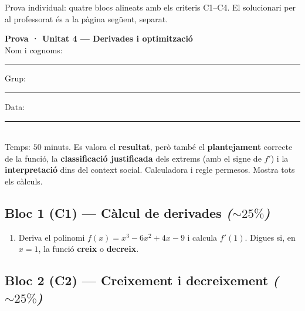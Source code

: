 %
{Prova individual: quatre blocs alineats amb els criteris C1–C4. El solucionari per al professorat és a la pàgina següent, separat.}

\begin{tcolorbox}[colback=white, colframe=udnavy, boxrule=0.8pt, arc=2pt,
  left=8pt, right=8pt, top=6pt, bottom=6pt]
\textbf{Prova · Unitat 4 — Derivades i optimització}\\[4pt]
Nom i cognoms: \rule{6.5cm}{0.4pt} \quad Grup: \rule{1.6cm}{0.4pt} \quad Data: \rule{2.2cm}{0.4pt}\\[6pt]
\small Temps: $50$ minuts. Es valora el \textbf{resultat}, però també el
\textbf{plantejament} correcte de la funció, la \textbf{classificació justificada} dels
extrems (amb el signe de $f'$) i la \textbf{interpretació} dins del context social.
Calculadora i regle permesos. Mostra tots els càlculs.
\end{tcolorbox}

\vspace{0.4em}

\subsection*{Bloc 1 (C1) — Càlcul de derivades \hfill \normalfont\itshape ($\sim 25\%$)}

\begin{enumerate}[label=\textbf{\arabic*.}, leftmargin=2em, itemsep=7pt]
  \item Deriva el polinomi $f(x)=x^3-6x^2+4x-9$ i calcula $f'(1)$. Digues si, en
        $x=1$, la funció \textbf{creix} o \textbf{decreix}.
\end{enumerate}

\subsection*{Bloc 2 (C2) — Creixement i decreixement \hfill \normalfont\itshape ($\sim 25\%$)}

